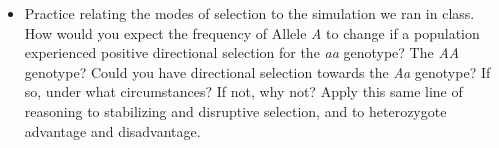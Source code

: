 \documentclass[letterpaper]{tufte-handout}
\newcommand{\allele}[1]{\textit{#1}}
\begin{document}
\begin{itemize}
	\item Practice relating the modes of selection to the simulation
	we ran in class.  How would you expect the frequency of Allele
	\allele{A} to change if a population experienced positive directional
	selection for the \allele{aa} genotype?  The \allele{AA} genotype?  Could
	you have directional selection towards the \allele{Aa} genotype?  If
	so, under what circumstances?  If not, why not?  Apply this
	same line of reasoning to stabilizing and disruptive
	selection, and to heterozygote advantage and disadvantage.

\end{itemize}
\end{document}
